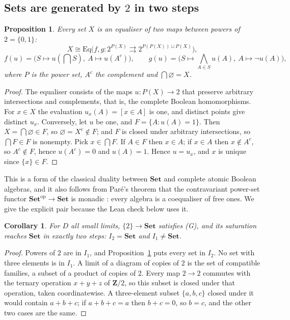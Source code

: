 \documentclass[11pt,a4paper]{amsart}
\newtheorem{proposition}[theorem]{Proposition}
\newtheorem{corollary}[theorem]{Corollary}
\theoremstyle{definition}
\theoremstyle{remark}
\newcommand{\Set}{\mathbf{Set}}
\begin{document}
\subsection{Sets are generated by $2$ in two steps}

\begin{proposition}\label{p:eq}
Every set $X$ is an equaliser of two maps between powers of $2=\{0,1\}$:
\[X\cong\mathrm{Eq}\bigl(f,g\colon2^{P(X)}\rightrightarrows2^{P(P(X))\sqcup P(X)}\bigr),\]
\[f(u)=\bigl(S\mapsto u(\textstyle\bigcap S),\ A\mapsto u(A^c)\bigr),\qquad g(u)=\bigl(S\mapsto\textstyle\bigwedge_{A\in S}u(A),\ A\mapsto\neg u(A)\bigr),\]
where $P$ is the power set, $A^c$ the complement and $\bigcap\varnothing=X$.
\end{proposition}

\begin{proof}
The equaliser consists of the maps $u\colon P(X)\to2$ that preserve arbitrary intersections and complements, that is, the complete Boolean homomorphisms. For $x\in X$ the evaluation $u_x(A)=[x\in A]$ is one, and distinct points give distinct $u_x$. Conversely, let $u$ be one, and $F=\{A:u(A)=1\}$. Then $X=\bigcap\varnothing\in F$, so $\varnothing=X^c\notin F$; and $F$ is closed under arbitrary intersections, so $\bigcap F\in F$ is nonempty. Pick $x\in\bigcap F$. If $A\in F$ then $x\in A$; if $x\in A$ then $x\notin A^c$, so $A^c\notin F$, hence $u(A^c)=0$ and $u(A)=1$. Hence $u=u_x$, and $x$ is unique since $\{x\}\in F$.
\end{proof}

This is a form of the classical duality between $\Set$ and complete atomic Boolean algebras, and it also follows from Paré's theorem that the contravariant power-set functor $\Set^{\mathrm{op}}\to\Set$ is monadic \cite{pare}: every algebra is a coequaliser of free ones. We give the explicit pair because the Lean check below uses it.

\begin{corollary}\label{c:twosteps}
For $D$ all small limits, $\{2\}\to\Set$ satisfies (G), and its saturation reaches $\Set$ in exactly two steps: $I_2=\Set$ and $I_1\neq\Set$.
\end{corollary}

\begin{proof}
Powers of $2$ are in $I_1$, and Proposition~\ref{p:eq} puts every set in $I_2$. No set with three elements is in $I_1$. A limit of a diagram of copies of $2$ is the set of compatible families, a subset of a product of copies of $2$. Every map $2\to2$ commutes with the ternary operation $x+y+z$ of $\mathbf Z/2$, so this subset is closed under that operation, taken coordinatewise. A three-element subset $\{a,b,c\}$ closed under it would contain $a+b+c$; if $a+b+c=a$ then $b+c=0$, so $b=c$, and the other two cases are the same.
\end{proof}
\end{document}
